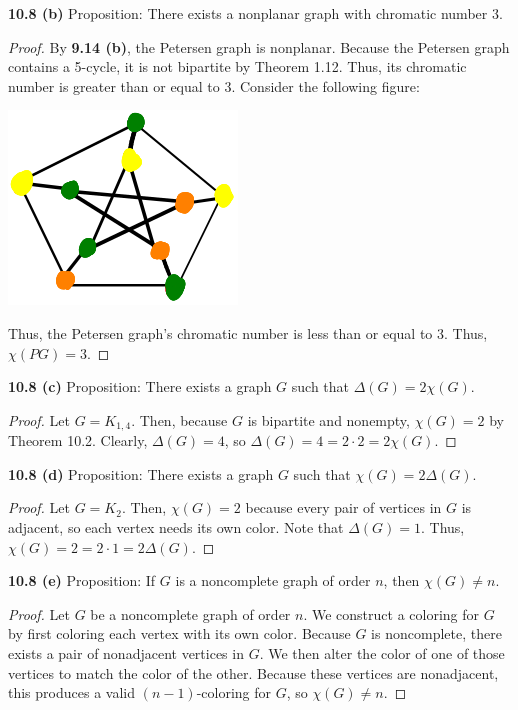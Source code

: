 \documentclass[12pt]{article}
\begin{document}
\medskip\noindent\textbf{10.8 (b)} Proposition: There exists a nonplanar graph with chromatic number 3.
\begin{proof}
    By \textbf{9.14 (b)}, the Petersen graph is nonplanar.
    Because the Petersen graph contains a 5-cycle, it is not bipartite by Theorem 1.12.
    Thus, its chromatic number is greater than or equal to 3.
    Consider the following figure:
    \begin{center}\includegraphics{fig2.png}\end{center}
    Thus, the Petersen graph's chromatic number is less than or equal to 3.
    Thus, $\chi(PG) = 3$.
\end{proof}

\medskip\noindent\textbf{10.8 (c)} Proposition: There exists a graph $G$ such that $\Delta(G) = 2\chi(G)$.
\begin{proof}
    Let $G = K_{1,4}$.
    Then, because $G$ is bipartite and nonempty, $\chi(G) = 2$ by Theorem 10.2.
    Clearly, $\Delta(G) = 4$, so $\Delta(G) = 4 = 2 \cdot 2 = 2\chi(G)$.
\end{proof}

\medskip\noindent\textbf{10.8 (d)} Proposition: There exists a graph $G$ such that $\chi(G) = 2\Delta(G)$.
\begin{proof}
        Let $G = K_2$.
        Then, $\chi(G) = 2$ because every pair of vertices in $G$ is adjacent, so each vertex needs its own color.
        Note that $\Delta(G) = 1$.
        Thus, $\chi(G) = 2 = 2 \cdot 1 = 2\Delta(G)$.
\end{proof}

\medskip\noindent\textbf{10.8 (e)} Proposition: If $G$ is a noncomplete graph of order $n$, then $\chi(G) \neq n$.
\begin{proof}
    Let $G$ be a noncomplete graph of order $n$.
    We construct a coloring for $G$ by first coloring each vertex with its own color.
    Because $G$ is noncomplete, there exists a pair of nonadjacent vertices in $G$.
    We then alter the color of one of those vertices to match the color of the other.
    Because these vertices are nonadjacent, this produces a valid $(n-1)$-coloring for $G$, so $\chi(G) \neq n$.
\end{proof}
\end{document}
